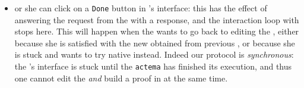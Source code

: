 \begin{itemize}
  \item or she can click on a \texttt{Done} button in 's interface:
  this has the effect of answering the  request from the
   with a  response, and the interaction loop with
   stops here. This will happen when the  wants to go
  back to editing the , either because she is satisfied with
  the new  obtained from previous , or because she is stuck
  and wants to try native   instead. Indeed our protocol is
  \emph{synchronous}: the 's interface is stuck until the
  \texttt{actema}  has finished its execution, and thus one cannot
  edit the  \emph{and} build a proof in  at the same
  time.
\end{itemize}


